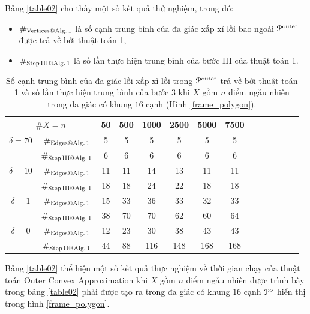 \documentclass[12pt,a4paper,openany,oneside]{report}
\begin{document}
\medskip
Bảng \ref{table02} cho thấy một số kết quả thử nghiệm, trong đó:
\begin{itemize}
	\item $\#_{\rm Vertices @ Alg.\, 1}$  là số cạnh trung bình của đa giác xấp xỉ lồi bao ngoài ${\cal P}^{\rm outer}$ được trả về bởi thuật toán 1,
	\item $\#_{\rm Step\, III @ Alg.\, 1}$ là số lần thực hiện trung bình của bước III của thuật toán 1.
\end{itemize}

\begin{table}[ht]
	\begin{center}\renewcommand{\arraystretch}{1.2}\small
		\setlength\tabcolsep{0.2cm}
		\begin{tabular}{|c|c||c|c|c|c|c|c|c|c|c|c|c|c|}
			\hline
			\multicolumn {2}{|c||}{\footnotesize $\#X=n$}  & 50 & 500 & 1000 & 2500 & 5000 & 7500\\ 
			\hline		
			\hline
			{ $\delta = 70$}
			
			& $\#_{\rm Edges@ Alg.\, 1}$  &5 & 5 & 5 & 5 & 5 & 5 \\
			
			& $\#_{\rm Step\, III @ Alg.\,1}$ &6 & 6 & 6 & 6 & 6 & 6   \\
			\hline
			{ $\delta = 10$}
			
			& $\#_{\rm Edges@ Alg.\,1}$  &11 & 11 & 14 & 13 & 11 & 11 \\
			
			& $\#_{\rm Step\, III @ Alg.\, 1}$&18 & 18 & 24 & 22 & 18 & 18\\
			\hline
			{ $\delta = 1$}
			
			& $\#_{\rm Edges@ Alg.\,1}$  &15 & 33 & 36 & 33 & 32 & 33 \\
			
			& $\#_{\rm Step\, III @ Alg.\, 1}$&38 & 70 & 70 & 62 & 60 & 64  \\
			\hline
			{ $\delta = 0$}
			
			& $\#_{\rm Edges@ Alg.\, 1}$  &12 & 23 & 30 & 38 & 43 & 43  \\
			
			& $\#_{\rm Step\, II @ Alg.\, 1}$&44 & 88 & 116 & 148 & 168 & 168  \\
			\hline
		\end{tabular}
		\caption{Số cạnh trung bình của đa giác lồi xấp xỉ lồi trong ${\cal P}^{\rm outer}$ trả về bởi thuật toán 1 và số lần thực hiện trung bình của bước 3 khi $X$ gồm $n$ điểm ngẫu nhiên trong đa giác có khung $16$ cạnh (Hình \ref{frame_polygon}).}
		\label{table03}
	\end{center}
\end{table} 	
\medskip
Bảng \ref{table02} thể hiện một số kết quả thực nghiệm về thời gian chạy của thuật toán Outer Convex Approximation khi $X$ gồm $n$ điểm ngẫu nhiên được trình bày trong bảng \ref{table02} phải được tạo ra trong đa giác có khung $16$ cạnh ${\cal P}^\diamond$ hiển thị trong hình \ref{frame_polygon}.
\end{document}
